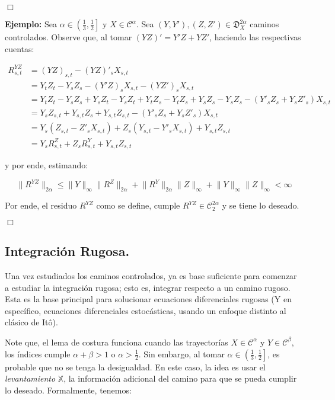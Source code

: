 \begin{flushright}
	$\Box$
\end{flushright}

\textbf{Ejemplo:} Sea $\alpha \in \left( \frac{1}{3}, \frac{1}{2}  \right]$ y $X \in \mathcal{C}^{\alpha}$. Sea $(Y, Y'), (Z, Z') \in \mathfrak{D}_X^{2\alpha}$ caminos controlados. Observe que, al tomar $(YZ)' = Y' Z + Y Z'$, haciendo las respectivas cuentas:

\begin{align*}
	R^{YZ}_{s,t} &= (YZ)_{s,t} - (YZ)'_s X_{s,t}\\
	&= Y_t Z_t - Y_s Z_s - (Y'Z)_s X_{s,t} - (YZ')_s X_{s,t} \\
	&= Y_t Z_t - Y_s Z_s + Y_s Z_t - Y_s Z_t + Y_t Z_s - Y_t Z_s + Y_s Z_s - Y_s Z_s - (Y'_s Z_s + Y_s Z'_s ) X_{s,t} \\
	&= Y_s Z_{s,t} + Y_{s,t} Z_s + Y_{s,t} Z_{s,t} - (Y'_s Z_s + Y_s Z'_s ) X_{s,t} \\
	&= Y_s ( Z_{s,t} - Z'_s X_{s,t} ) + Z_s (Y_{s,t} - Y'_s X_{s,t}) + Y_{s,t} Z_{s,t} \\
	&= Y_s R^Z_{s,t} + Z_s R^Y_{s,t} + Y_{s,t} Z_{s,t}
\end{align*}

y por ende, estimando:

\[
	\lVert R^{YZ} \rVert_{2 \alpha} \leq \lVert Y \rVert_{\infty} \lVert R^{Z} \rVert_{2 \alpha} + \lVert R^Y \rVert_{2\alpha} \lVert Z \rVert_{\infty} + \lVert Y \rVert_{\infty} \lVert Z \rVert_{\infty} < \infty
\]


Por ende, el residuo $R^{YZ}$ como se define, cumple $R^{YZ} \in \mathcal{C}^{2\alpha}_2$ y se tiene lo deseado.

\begin{flushright}
	$\Box$
\end{flushright}



\subsection{Integración Rugosa.}

Una vez estudiados los caminos controlados, ya es base suficiente para comenzar a estudiar la integración rugosa; esto es, integrar respecto a un camino rugoso. Esta es la base principal para solucionar ecuaciones diferenciales rugosas (Y en específico, ecuaciones diferenciales estocásticas, usando un enfoque distinto al clásico de Itô).

Note que, el lema de costura funciona cuando las trayectorías $X \in \mathcal{C}^{\alpha}$ y $Y \in \mathcal{C}^{\beta}$, los índices cumple $\alpha + \beta > 1$ o $\alpha > \frac{1}{2}$. Sin embargo, al tomar $\alpha \in \left( \frac{1}{3}, \frac{1}{2} \right]$, es probable que no se tenga la desigualdad. En este caso, la idea es usar el \textit{levantamiento} $\mathbb{X}$, la información adicional del camino para que se pueda cumplir lo deseado. Formalmente, tenemos:

